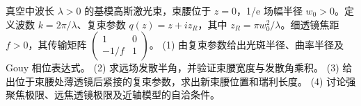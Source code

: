 真空中波长 \(\lambda>0\) 的基模高斯激光束，束腰位于 \(z=0\)，1/e 场幅半径 \(w_0>0\)。定义波数 \(k=2\pi/\lambda\)、复束参数 \(q(z)=z+iz_R\)，其中 \(z_R=\pi w_0^2/\lambda\)。细透镜焦距 \(f>0\)，其传输矩阵 \(\begin{pmatrix}1&0\\-1/f&1\end{pmatrix}\)。
(1) 由复束参数给出光斑半径、曲率半径及 Gouy 相位表达式。
(2) 求远场发散半角，并验证束腰宽度与发散角乘积。
(3) 给出位于束腰处薄透镜后紧接的复束参数，求出新束腰位置和瑞利长度。
(4) 讨论强聚焦极限、远焦透镜极限及近轴模型的自洽条件。
